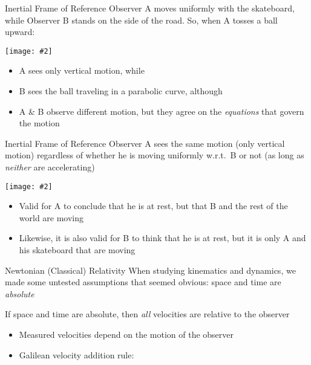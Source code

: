 \documentclass[12pt,compress,aspectratio=169]{beamer}
\newcommand{\mb}[1]{\mathbf{#1}}
\newcommand{\pic}[2]{\texttt{[image: \#2]}}
\newcommand{\eq}[2]{\vspace{#1}{\Large\begin{displaymath}#2\end{displaymath}}}
\begin{document}
\begin{frame}{Inertial Frame of Reference}
  Observer A moves uniformly with the skateboard, while Observer B stands on
  the side of the road. So, when A tosses a ball upward:
  \begin{center}
    \pic{.55}{graphics/57}
  \end{center}
  \begin{itemize}
  \item A sees only vertical motion, while
  \item B sees the ball traveling in a parabolic curve, although
  \item A \& B observe different motion, but they agree on the \emph{equations}
    that govern the motion
  \end{itemize}
\end{frame}



\begin{frame}{Inertial Frame of Reference}
  Observer A sees the same motion (only vertical motion) regardless of whether
  he is moving uniformly w.r.t.\ B or not (as long as \emph{neither} are
  accelerating)
  \begin{center}
    \pic{.55}{graphics/57.png}
  \end{center}
  \begin{itemize}
  \item Valid for A to conclude that he is at rest, but that B and the rest of
    the world are moving
  \item Likewise, it is also valid for B to think that he is at rest, but it is
    only A and his skateboard that are moving
  \end{itemize}
\end{frame}
    

\begin{frame}{Newtonian (Classical) Relativity}
  When studying kinematics and dynamics, we made some untested assumptions that
  seemed obvious: space and time are \emph{absolute}
  \vspace{.1in}If space and time are absolute, then \emph{all} velocities are
  relative to the observer
  \begin{itemize}
  \item Measured velocities depend on the motion of the observer
  \item Galilean velocity addition rule:

    \eq{-.25in}{
      \boxed{\mb{v}_{AC}=\mb{v}_{AB}+\mb{v}_{BC}}
    }
  \end{itemize}
\end{frame}
\end{document}
